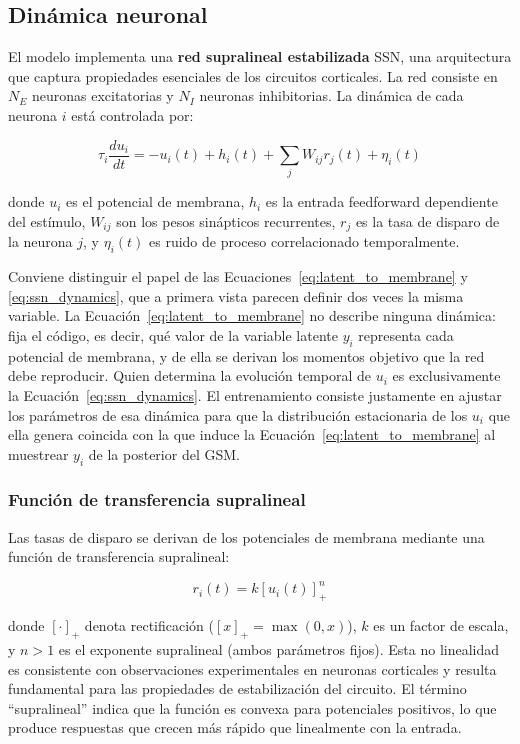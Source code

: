 \subsection{Dinámica neuronal}
\label{subsec:echeveste_dinamica}

El modelo implementa una \textbf{red supralineal estabilizada} \acrfull{SSN}, una arquitectura que captura propiedades esenciales de los circuitos corticales. La red consiste en $N_E$ neuronas excitatorias y $N_I$ neuronas inhibitorias. La dinámica de cada neurona $i$ está controlada por:

\begin{equation}
\tau_i \frac{du_i}{dt} = -u_i(t) + h_i(t) + \sum_j W_{ij} r_j(t) + \eta_i(t)
\label{eq:ssn_dynamics}
\end{equation}

donde $u_i$ es el potencial de membrana, $h_i$ es la entrada feedforward dependiente del estímulo, $W_{ij}$ son los pesos sinápticos recurrentes, $r_j$ es la tasa de disparo de la neurona $j$, y $\eta_i(t)$ es ruido de proceso correlacionado temporalmente.

Conviene distinguir el papel de las Ecuaciones~\ref{eq:latent_to_membrane} y \ref{eq:ssn_dynamics}, que a primera vista parecen definir dos veces la misma variable. La Ecuación~\ref{eq:latent_to_membrane} no describe ninguna dinámica: fija el código, es decir, qué valor de la variable latente $y_i$ representa cada potencial de membrana, y de ella se derivan los momentos objetivo que la red debe reproducir. Quien determina la evolución temporal de $u_i$ es exclusivamente la Ecuación~\ref{eq:ssn_dynamics}. El entrenamiento consiste justamente en ajustar los parámetros de esa dinámica para que la distribución estacionaria de los $u_i$ que ella genera coincida con la que induce la Ecuación~\ref{eq:latent_to_membrane} al muestrear $y_i$ de la posterior del \acrshort{GSM}.

\subsubsection{Función de transferencia supralineal}

Las tasas de disparo se derivan de los potenciales de membrana mediante una función de transferencia supralineal:

\begin{equation}
r_i(t) = k \left[ u_i(t) \right]_+^n
\label{eq:firing_rate}
\end{equation}

donde $[\cdot]_+$ denota rectificación ($[x]_+ = \max(0, x)$), $k$ es un factor de escala, y $n > 1$ es el exponente supralineal (ambos parámetros fijos). Esta no linealidad es consistente con observaciones experimentales en neuronas corticales y resulta fundamental para las propiedades de estabilización del circuito. El término ``supralineal'' indica que la función es convexa para potenciales positivos, lo que produce respuestas que crecen más rápido que linealmente con la entrada.

